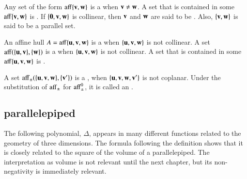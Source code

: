 	
\begin{definition}
  Any set of the form ${\operatorname{aff}}\{{\mathbf v},{\mathbf w}\}$ is a  when
  ${\mathbf v}\ne {\mathbf w}$.  A set that is contained in some $\operatorname{aff}\{{\mathbf v},{\mathbf w}\}$ is
  .  If $\{{\mathbf 0},{\mathbf v},{\mathbf w}\}$ is collinear, then
  ${\mathbf v}$ and ${\mathbf w}$ are said to be . Also, $\{{\mathbf v},{\mathbf w}\}$
  is said to be a parallel set.
\end{definition}
%
%

\begin{definition}\label{def:plane}
  An affine hull $A={\operatorname{aff}}\{{\mathbf u},{\mathbf v},{\mathbf w}\}$ is a  when
  $\{{\mathbf u},{\mathbf v},{\mathbf w}\}$ is not collinear.  A set ${\operatorname{aff}}(\{{\mathbf u},{\mathbf v}\},\{{\mathbf w}\})$
  is a  when $\{{\mathbf u},{\mathbf v},{\mathbf w}\}$ is not collinear. A
  set that is contained in some $\operatorname{aff}\{{\mathbf u},{\mathbf v},{\mathbf w}\}$ is .
\end{definition}
%
%
%
%


\begin{definition} 
A set
  ${\operatorname{aff}}_{\pm}(\{{\mathbf u},{\mathbf v},{\mathbf w}\},\{{\mathbf v}'\})$ is a ,
  when $\{{\mathbf u},{\mathbf v},{\mathbf w},{\mathbf v}'\}$ is not coplanar.  Under the substitution of
  ${\operatorname{aff}}_{\pm}$ for ${\operatorname{aff}}_{\pm}^0$, it is called an
  .
\end{definition}
%
%

\subsection{parallelepiped}\label{sec:piped}
%



The following polynomial, $\Delta$, appears in many different
functions related to the geometry of three dimensions.  The formula
following the definition shows that it is closely related to the
square of the volume of a parallelepiped.  The interpretation as
volume is not relevant until the next chapter, but  its non-negativity is
immediately relevant.  %

